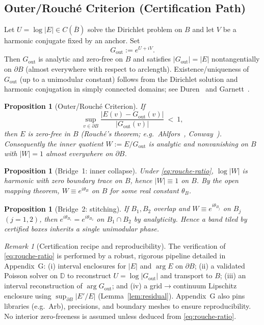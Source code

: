 \documentclass[11pt]{article}
\numberwithin{equation}{section}
\newtheorem{proposition}[theorem]{Proposition}
\theoremstyle{remark}
\newtheorem{remark}[theorem]{Remark}
\newcommand{\D}{\mathbb{D}}
\newcommand{\Gout}{G_{\mathrm{out}}}
\begin{document}
\subsection{Outer/Rouch\'e Criterion (Certification Path)}\label{subsec:rouche-criterion}

Let $U=\log|E|\in C(\overline B)$ solve the Dirichlet problem on $B$ and let $V$ be a harmonic conjugate fixed by an anchor. Set
\[
\Gout:=e^{U+iV}.
\]
Then $\Gout$ is analytic and zero-free on $B$ and satisfies $|\Gout|=|E|$ nontangentially on $\partial B$ (almost everywhere with respect to arclength). Existence/uniqueness of $\Gout$ (up to a unimodular constant) follows from the Dirichlet solution and harmonic conjugation in simply connected domains; see Duren~\cite[§II.5]{DurenHp} and Garnett~\cite[§II.2]{GarnettBAF}.

\begin{proposition}[Outer/Rouch\'e Criterion]\label{prop:rouche-criterion}
If
\begin{equation}\label{eq:rouche-ratio}
\sup_{v\in\partial B}\frac{|E(v)-\Gout(v)|}{|\Gout(v)|}\ <\ 1,
\end{equation}
then $E$ is zero-free in $B$ (Rouch\'e's theorem; e.g.\ Ahlfors~\cite[§§5--6]{Ahlfors}, Conway~\cite[Ch.~VI]{Conway}). Consequently the inner quotient $W:=E/\Gout$ is analytic and nonvanishing on $B$ with $|W|=1$ almost everywhere on $\partial B$.
\end{proposition}

\begin{proposition}[Bridge~1: inner collapse]\label{prop:bridge1}
Under \eqref{eq:rouche-ratio}, $\log|W|$ is harmonic with zero boundary trace on $B$, hence $|W|\equiv 1$ on $B$. By the open mapping theorem, $W\equiv e^{i\theta_B}$ on $B$ for some real constant $\theta_B$.
\end{proposition}

\begin{proposition}[Bridge~2: stitching]\label{prop:bridge2}
If $B_1,B_2$ overlap and $W\equiv e^{i\theta_{B_j}}$ on $B_j$ $(j=1,2)$, then $e^{i\theta_{B_1}}=e^{i\theta_{B_2}}$ on $B_1\cap B_2$ by analyticity. Hence a band tiled by certified boxes inherits a single unimodular phase.
\end{proposition}

\begin{remark}[Certification recipe and reproducibility]
The verification of \eqref{eq:rouche-ratio} is performed by a robust, rigorous pipeline detailed in Appendix~G: (i) interval enclosures for $|E|$ and $\arg E$ on $\partial B$; (ii) a validated Poisson solver on $\D$ to reconstruct $U=\log|\Gout|$ and transport to $B$; (iii) an interval reconstruction of $\arg\Gout$; and (iv) a grid$\to$continuum Lipschitz enclosure using $\sup_{\partial B}|E'/E|$ (Lemma~\ref{lem:residual}). Appendix~G also pins libraries (e.g.\ Arb), precisions, and boundary meshes to ensure reproducibility. No interior zero-freeness is assumed unless deduced from \eqref{eq:rouche-ratio}.
\end{remark}
\end{document}
